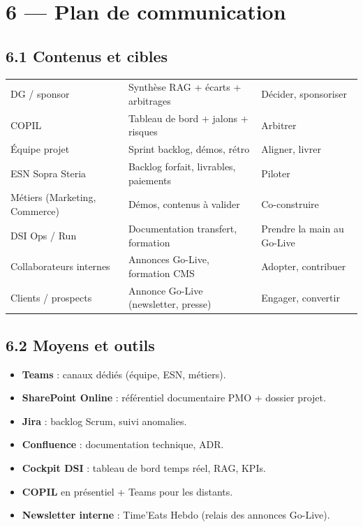 \documentclass[11pt,a4paper,oneside]{report}
\begin{document}
\newpage
\section*{6 --- Plan de communication}

\subsection*{6.1 Contenus et cibles}
\renewcommand{\arraystretch}{1.4}
\begin{tabularx}{\textwidth}{L{3cm} L{3.5cm} Y}
\toprule
{} &  &  \\
\midrule
DG / sponsor       & Synthèse RAG + écarts + arbitrages & Décider, sponsoriser \\
COPIL              & Tableau de bord + jalons + risques & Arbitrer \\
Équipe projet      & Sprint backlog, démos, rétro & Aligner, livrer \\
ESN Sopra Steria   & Backlog forfait, livrables, paiements & Piloter \\
Métiers (Marketing, Commerce) & Démos, contenus à valider & Co-construire \\
DSI Ops / Run      & Documentation transfert, formation & Prendre la main au Go-Live \\
Collaborateurs internes & Annonces Go-Live, formation CMS & Adopter, contribuer \\
Clients / prospects & Annonce Go-Live (newsletter, presse) & Engager, convertir \\
\bottomrule
\end{tabularx}

\subsection*{6.2 Moyens et outils}
\begin{itemize}
  \item \textbf{Teams} : canaux dédiés (équipe, ESN, métiers).
  \item \textbf{SharePoint Online} : référentiel documentaire PMO + dossier projet.
  \item \textbf{Jira} : backlog Scrum, suivi anomalies.
  \item \textbf{Confluence} : documentation technique, ADR.
  \item \textbf{Cockpit DSI} : tableau de bord temps réel, RAG, KPIs.
  \item \textbf{COPIL} en présentiel + Teams pour les distants.
  \item \textbf{Newsletter interne} : Time'Eats Hebdo (relais des annonces Go-Live).
\end{itemize}
\end{document}

